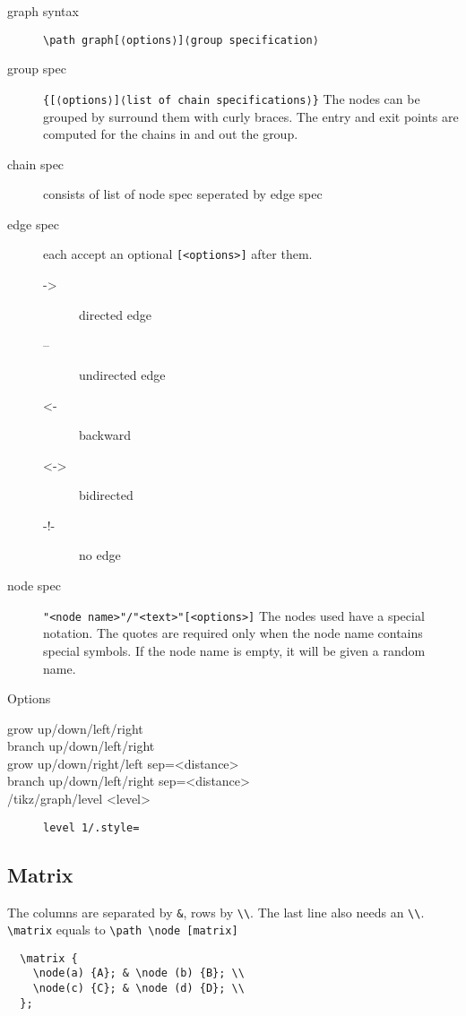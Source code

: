 \begin{description}
\item [graph syntax] \verb$\path graph[⟨options⟩]⟨group specification⟩$
\item [group spec] \verb${[⟨options⟩]⟨list of chain specifications⟩}$
  The nodes can be grouped by surround them with curly braces. The
  entry and exit points are computed for the chains in and out the
  group.

\item [chain spec] consists of list of node spec seperated by edge
  spec
\item [edge spec] each accept an optional \texttt{[<options>]} after them.
  \begin{description}
  \item [->] directed edge
  \item [--] undirected edge
  \item [<-] backward
  \item [<->] bidirected
  \item [-!-] no edge
  \end{description}
\item [node spec] \verb$"<node name>"/"<text>"[<options>]$ The nodes
  used have a special notation. The quotes are required only when the
  node name contains special symbols. If the node name is empty, it
  will be given a random name.
\end{description}

Options
\begin{description}
\item [grow up/down/left/right]
\item [branch up/down/left/right]
\item [grow up/down/right/left sep=<distance>]
\item [branch up/down/left/right sep=<distance>]
\item [/tikz/graph/level <level>] \texttt{level 1/.style={}}
\end{description}

\subsection{Matrix}
The columns are separated by \verb$&$, rows by \verb$\\$. The last
line also needs an \verb$\\$.
\verb$\matrix$ equals to \verb$\path \node [matrix]$
\begin{lstlisting}
  \matrix {
    \node(a) {A}; & \node (b) {B}; \\
    \node(c) {C}; & \node (d) {D}; \\
  };
\end{lstlisting}

